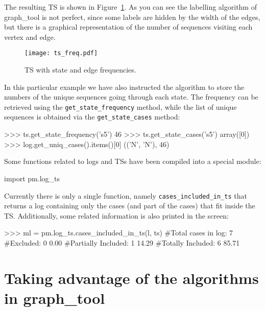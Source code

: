 \documentclass[a4paper,10pt]{book}
\begin{document}
The resulting TS is shown in Figure~\ref{fig:ts_freq}. As you can see the labelling algorithm of graph\_tool is not perfect, since some labels are hidden by the width of the edges, but there is a graphical representation of the number of sequences visiting each vertex and edge.
\begin{figure}[htb]
 \centering
 \texttt{[image: ts\_freq.pdf]}
 \caption{TS with state and edge frequencies.}
 \label{fig:ts_freq}
\end{figure}
In this particular example we have also instructed the algorithm to store the numbers of the unique sequences going through each state. The frequency can be retrieved using the \texttt{get\_state\_frequency} method, while the list of unique sequences is obtained via the \texttt{get\_state\_cases} method:\\
\begin{pycode}
>>> ts.get_state_frequency('s5')
46
>>> ts.get_state_cases('s5')
array([0])
>>> log.get_uniq_cases().items()[0]
(('N', 'N'), 46)
\end{pycode}


Some functions related to logs and TSs have been compiled into a special module:\\
\begin{pycode}
import pm.log_ts
\end{pycode}

Currently there is only a single function, namely \texttt{cases\_included\_in\_ts} that returns a log containing only the cases (and part of the cases) that fit inside the TS. Additionally, some related information is also printed in the screen:\\

\begin{pycode}
>>> ml = pm.log_ts.cases_included_in_ts(l, ts)
#Total cases in log:  7
#Excluded:            0   0.00%
#Partially Included:  1  14.29%
#Totally Included:    6  85.71%
\end{pycode}

\section{Taking advantage of the algorithms in graph\_tool}
\end{document}
